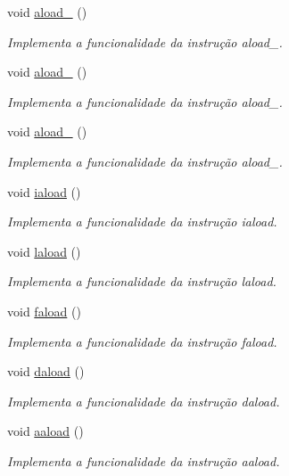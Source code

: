 \begin{DoxyCompactItemize}
void \hyperlink{classOperations_a8291f2b716c1be7428d9b63a5225b52d}{aload\+\_} ()
\begin{DoxyCompactList}\small\item\em Implementa a funcionalidade da instrução aload\+\_. \end{DoxyCompactList}\item 
void \hyperlink{classOperations_abd58f463152d7f88b9fb2f133c6ca184}{aload\+\_} ()
\begin{DoxyCompactList}\small\item\em Implementa a funcionalidade da instrução aload\+\_. \end{DoxyCompactList}\item 
void \hyperlink{classOperations_ac0cadd4fe7c17eab1985f11b5389fafc}{aload\+\_} ()
\begin{DoxyCompactList}\small\item\em Implementa a funcionalidade da instrução aload\+\_. \end{DoxyCompactList}\item 
void \hyperlink{classOperations_a77f3b4c161fee7fbd6bb89b170400c0c}{iaload} ()
\begin{DoxyCompactList}\small\item\em Implementa a funcionalidade da instrução iaload. \end{DoxyCompactList}\item 
void \hyperlink{classOperations_a064f10825e8f0153ef19d466845d3734}{laload} ()
\begin{DoxyCompactList}\small\item\em Implementa a funcionalidade da instrução laload. \end{DoxyCompactList}\item 
void \hyperlink{classOperations_ac22c02d88fa894cafd3f53c54d91409d}{faload} ()
\begin{DoxyCompactList}\small\item\em Implementa a funcionalidade da instrução faload. \end{DoxyCompactList}\item 
void \hyperlink{classOperations_a63691de547749780c372e285bd6a97bc}{daload} ()
\begin{DoxyCompactList}\small\item\em Implementa a funcionalidade da instrução daload. \end{DoxyCompactList}\item 
void \hyperlink{classOperations_a522dfa2224d54268008f3bec4ff2b388}{aaload} ()
\begin{DoxyCompactList}\small\item\em Implementa a funcionalidade da instrução aaload. \end{DoxyCompactList}\item 

\end{DoxyCompactItemize}
